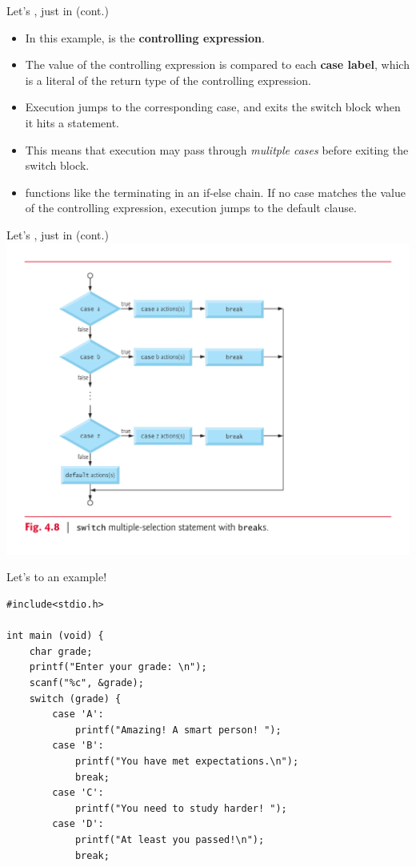 \documentclass[11pt]{beamer}
\let\OldTexttt\texttt
\renewcommand{\texttt}[1]{\OldTexttt{\color{teal}{#1}}}
\begin{document}
\begin{frame}{Let's \texttt{switch}, just in \texttt{case} (cont.)}
\begin{itemize} 
\item In this example, \texttt{x} is the \textbf{controlling expression}.
\item The value of the controlling expression is compared to each \textbf{case label}, which is a literal of the return type of the controlling expression.
\item Execution jumps to the corresponding case, and exits the switch block when it hits a \texttt{break} statement.
\item This means that execution may pass through \emph{mulitple cases} before exiting the switch block.
\item \texttt{default} functions like the terminating \texttt{else} in an if-else chain.  If no case matches the value of the controlling expression, execution jumps to the default clause. 
\end{itemize}
\end{frame}

\begin{frame}[fragile=singleslide]{Let's \texttt{switch}, just in \texttt{case} (cont.)}
\center
\includegraphics[scale=0.35]{switchflowchart.png}
\end{frame}

\begin{frame}[fragile=singleslide]{Let's \texttt{switch} to an example! }
\begin{lstlisting}[style=C]
#include<stdio.h>

int main (void) {
	char grade;
	printf("Enter your grade: \n");
	scanf("%c", &grade);
	switch (grade) {
		case 'A':
			printf("Amazing! A smart person! ");
		case 'B':
			printf("You have met expectations.\n");
			break;
		case 'C':
			printf("You need to study harder! ");
		case 'D':
			printf("At least you passed!\n");
			break;
\end{lstlisting}
\end{frame}
\end{document}
